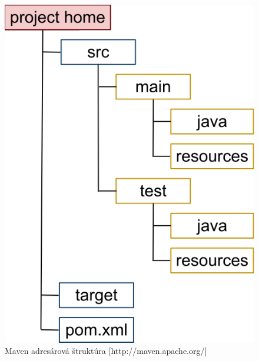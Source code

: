 \begin{figure}[htb]

\begin{center}

\includegraphics[scale=0.5]{maven.jpg} 
\caption{Maven adresárová štruktúra [http://maven.apache.org/] }
\label{maven}

\end{center}

\end{figure}

